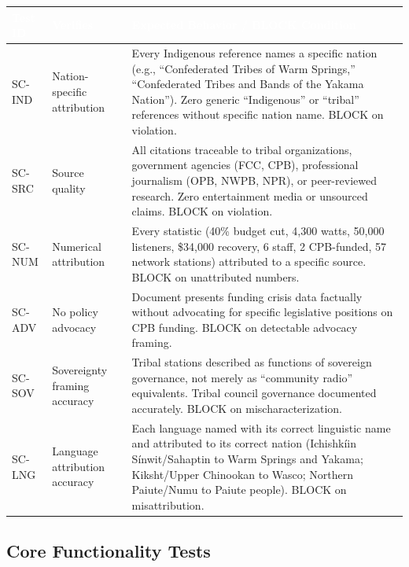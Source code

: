 \documentclass[11pt,letterpaper]{article}
\newcommand{\tableheader}[1]{\textbf{\sffamily\textcolor{white}{#1}}}
\begin{document}
\begin{center}
\begin{tabularx}{\textwidth}{C{1.2cm}L{4cm}X}
\toprule
{}
\tableheader{Test ID} & \tableheader{Verifies} & \tableheader{Expected Behavior / BLOCK Condition} \\
\midrule
SC-IND & Nation-specific attribution & Every Indigenous reference names a specific nation (e.g., ``Confederated Tribes of Warm Springs,'' ``Confederated Tribes and Bands of the Yakama Nation''). Zero generic ``Indigenous'' or ``tribal'' references without specific nation name. BLOCK on violation. \\
SC-SRC & Source quality & All citations traceable to tribal organizations, government agencies (FCC, CPB), professional journalism (OPB, NWPB, NPR), or peer-reviewed research. Zero entertainment media or unsourced claims. BLOCK on violation. \\
SC-NUM & Numerical attribution & Every statistic (40\% budget cut, 4,300 watts, 50,000 listeners, \$34,000 recovery, 6 staff, 2 CPB-funded, 57 network stations) attributed to a specific source. BLOCK on unattributed numbers. \\
SC-ADV & No policy advocacy & Document presents funding crisis data factually without advocating for specific legislative positions on CPB funding. BLOCK on detectable advocacy framing. \\
SC-SOV & Sovereignty framing accuracy & Tribal stations described as functions of sovereign governance, not merely as ``community radio'' equivalents. Tribal council governance documented accurately. BLOCK on mischaracterization. \\
SC-LNG & Language attribution accuracy & Each language named with its correct linguistic name and attributed to its correct nation (Ichishkíin Sínwit/Sahaptin to Warm Springs and Yakama; Kiksht/Upper Chinookan to Wasco; Northern Paiute/Numu to Paiute people). BLOCK on misattribution. \\
\bottomrule
\end{tabularx}
\end{center}

\subsection{Core Functionality Tests}
\end{document}
